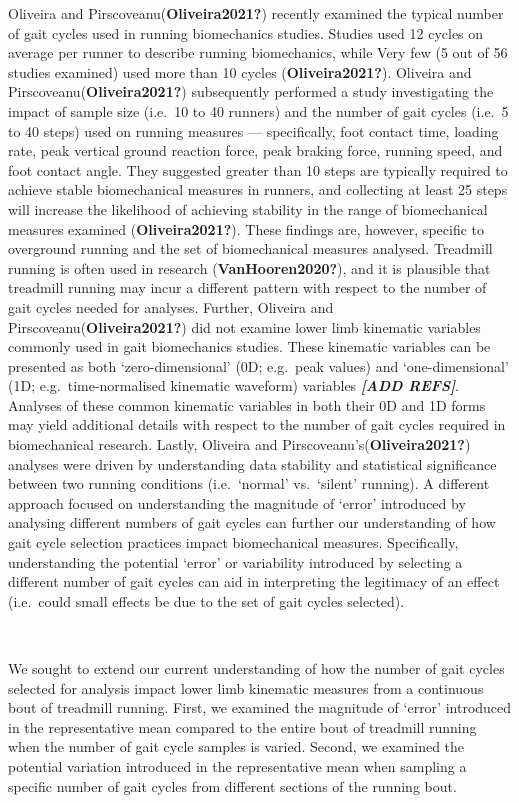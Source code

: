 \documentclass[]{elsarticle} %
\begin{document}
Oliveira and Pirscoveanu(\textbf{Oliveira2021?}) recently examined the
typical number of gait cycles used in running biomechanics studies.
Studies used 12 cycles on average per runner to describe running
biomechanics, while Very few (5 out of 56 studies examined) used more
than 10 cycles (\textbf{Oliveira2021?}). Oliveira and
Pirscoveanu(\textbf{Oliveira2021?}) subsequently performed a study
investigating the impact of sample size (i.e.~10 to 40 runners) and the
number of gait cycles (i.e.~5 to 40 steps) used on running measures ---
specifically, foot contact time, loading rate, peak vertical ground
reaction force, peak braking force, running speed, and foot contact
angle. They suggested greater than 10 steps are typically required to
achieve stable biomechanical measures in runners, and collecting at
least 25 steps will increase the likelihood of achieving stability in
the range of biomechanical measures examined (\textbf{Oliveira2021?}).
These findings are, however, specific to overground running and the set
of biomechanical measures analysed. Treadmill running is often used in
research (\textbf{VanHooren2020?}), and it is plausible that treadmill
running may incur a different pattern with respect to the number of gait
cycles needed for analyses. Further, Oliveira and
Pirscoveanu(\textbf{Oliveira2021?}) did not examine lower limb kinematic
variables commonly used in gait biomechanics studies. These kinematic
variables can be presented as both `zero-dimensional' (0D; e.g.~peak
values) and `one-dimensional' (1D; e.g.~time-normalised kinematic
waveform) variables \textbf{\emph{{[}ADD REFS{]}}}. Analyses of these
common kinematic variables in both their 0D and 1D forms may yield
additional details with respect to the number of gait cycles required in
biomechanical research. Lastly, Oliveira and
Pirscoveanu's(\textbf{Oliveira2021?}) analyses were driven by
understanding data stability and statistical significance between two
running conditions (i.e.~`normal' vs.~`silent' running). A different
approach focused on understanding the magnitude of `error' introduced by
analysing different numbers of gait cycles can further our understanding
of how gait cycle selection practices impact biomechanical measures.
Specifically, understanding the potential `error' or variability
introduced by selecting a different number of gait cycles can aid in
interpreting the legitimacy of an effect (i.e.~could small effects be
due to the set of gait cycles selected).

~

We sought to extend our current understanding of how the number of gait
cycles selected for analysis impact lower limb kinematic measures from a
continuous bout of treadmill running. First, we examined the magnitude
of `error' introduced in the representative mean compared to the entire
bout of treadmill running when the number of gait cycle samples is
varied. Second, we examined the potential variation introduced in the
representative mean when sampling a specific number of gait cycles from
different sections of the running bout.
\end{document}
